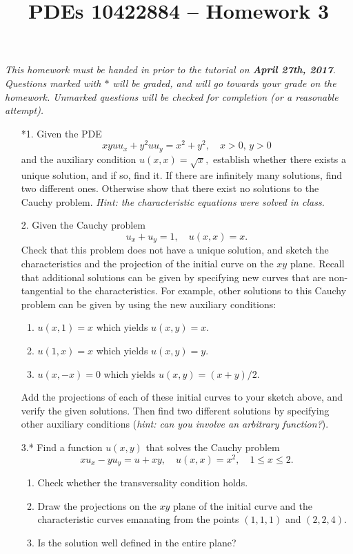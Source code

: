 \documentclass[10pt,a4paper]{article}
\title{PDEs 10422884 -- Homework 3}
\date{}
\begin{document}
\maketitle
\textsl{ This homework must be handed in prior to the tutorial on \textbf{April 27th, 2017}. Questions marked with $*$ will be graded, and will go towards your grade on the homework. Unmarked questions will be checked for completion (or a reasonable attempt).}

\begin{enumerate}
\item[*1.] Given the PDE %
\[ x y u u_x + y^2 u u_y = x^2 + y^2, \quad x>0, \, y>0 \]
and the auxiliary condition $u(x,x) = \sqrt{x},$ establish whether there exists a unique solution, and if so, find it. If there are infinitely many solutions, find two different ones. Otherwise show that there exist no solutions to the Cauchy problem. \emph{Hint: the characteristic equations were solved in class.}
\item[2.] Given the Cauchy problem %
\[ u_x + u_y = 1, \quad u(x,x) = x.\]
Check that this problem does not have a unique solution, and sketch the characteristics and the projection of the initial curve on the $xy$ plane. Recall that additional solutions can be given by specifying new curves that are non-tangential to the characteristics. For example, other solutions to this Cauchy problem can be given by using the new auxiliary conditions:
\begin{enumerate}
\item $u(x,1) = x$ which yields $u(x,y) = x.$
\item $u(1,x) = x$ which yields $u(x,y) = y.$
\item $u(x,-x) = 0$ which yields $u(x,y) = (x+y)/2.$
\end{enumerate} 
Add the projections of each of these initial curves to your sketch above, and verify the given solutions.
Then find two different solutions by specifying other auxiliary conditions (\emph{hint: can you involve an arbitrary function?}).

\item[3.*] Find a function $u(x,y)$ that solves the Cauchy problem %
\[ xu_x - yu_y = u+xy, \quad u(x,x) = x^2, \quad 1\leq x \leq 2. \]
\begin{enumerate}
\item Check whether the transversality condition holds.
\item Draw the projections on the $xy$ plane of the initial curve and the characteristic curves emanating from the points $(1,1,1)$ and $(2,2,4).$
\item Is the solution well defined in the entire plane?
\end{enumerate}
\end{enumerate}
\end{document}
